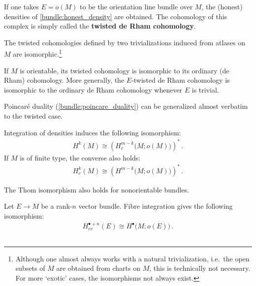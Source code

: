     If one takes $E=o(M)$ to be the orientation line bundle over $M$, the (honest) densities of \cref{bundle:honest_density} are obtained. The cohomology of this complex is simply called the \textbf{twisted de Rham cohomology}.
    \begin{property}[Isomorphism]
        The twisted cohomologies defined by two trivializations induced from atlases on $M$ are isomorphic.\footnote{Although one almost always works with a natural trivialization, i.e.~the open subsets of $M$ are obtained from charts on $M$, this is technically not necessary. For more `exotic' cases, the isomorphisms not always exist.}
    \end{property}
    \begin{property}
        If $M$ is orientable, its twisted cohomology is isomorphic to its ordinary (de Rham) cohomology. More generally, the $E$-twisted de Rham cohomology is isomorphic to the ordinary de Rham cohomology whenever $E$ is trivial.
    \end{property}

    Poincar\'e duality (\cref{bundle:poincare_duality}) can be generalized almost verbatim to the twisted case.
    \begin{theorem}
        Integration of densities induces the following isomorphism:
        \begin{gather}
            H^k(M)\cong\left(H^{m-k}_c\bigl(M;o(M)\bigr)\right)^*\,.
        \end{gather}
        If $M$ is of finite type, the converse also holds:
        \begin{gather}
            H^k_c(M)\cong\left(H^{m-k}\bigl(M;o(M)\bigr)\right)^*\,.
        \end{gather}
    \end{theorem}
    The Thom isomorphism also holds for nonorientable bundles.
    \begin{theorem}
        Let $E\rightarrow M$ be a rank-$n$ vector bundle. Fibre integration gives the following isomorphism:
        \begin{gather}
            H^{\bullet+n}_{cv}(E)\cong H^\bullet\bigl(M;o(E)\bigr)\,.
        \end{gather}
    \end{theorem}

\subsection{}

